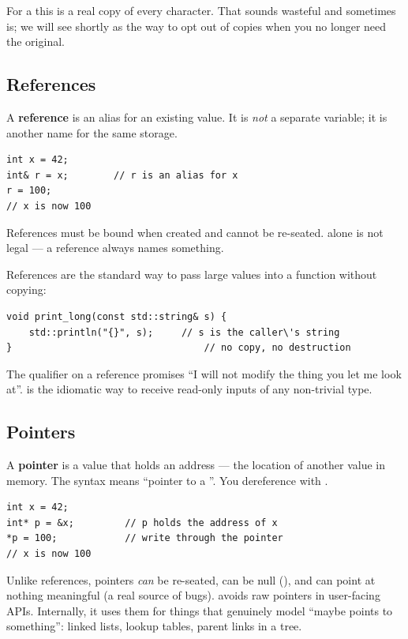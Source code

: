 For a  this is a real copy of every character.
That sounds wasteful and sometimes is; we will see 
shortly as the way to opt out of copies when you no longer need the
original.

\subsection{References}

A \textbf{reference} is an alias for an existing value. It is \emph{not}
a separate variable; it is another name for the same storage.

\begin{lstlisting}
int x = 42;
int& r = x;        // r is an alias for x
r = 100;
// x is now 100
\end{lstlisting}

References must be bound when created and cannot be re-seated.
 alone is not legal --- a reference always names
something.

References are the standard way to pass large values into a function
without copying:

\begin{lstlisting}
void print_long(const std::string& s) {
    std::println("{}", s);     // s is the caller\'s string
}                                  // no copy, no destruction
\end{lstlisting}

The  qualifier on a reference promises ``I will not
modify the thing you let me look at''.  is the
idiomatic way to receive read-only inputs of any non-trivial type.

\subsection{Pointers}

A \textbf{pointer} is a value that holds an address --- the location
of another value in memory. The syntax  means ``pointer to a
''. You dereference with \code{*}.

\begin{lstlisting}
int x = 42;
int* p = &x;         // p holds the address of x
*p = 100;            // write through the pointer
// x is now 100
\end{lstlisting}

Unlike references, pointers \emph{can} be re-seated, can be null
(), and can point at nothing meaningful (a real source
of bugs). \maya{} avoids raw pointers in user-facing APIs.
Internally, it uses them for things that genuinely model ``maybe
points to something'': linked lists, lookup tables, parent links
in a tree.

